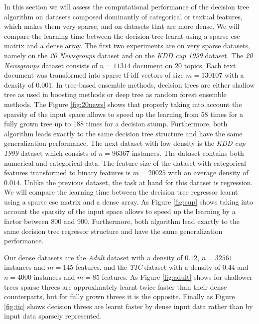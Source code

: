 In this section we will assess the computational performance of the decision tree algorithm on datasets composed dominantly of categorical or textual features, which makes them very sparse, and on datasets that are more dense. We will compare the learning time between the decision tree learnt
using a sparse csc matrix and a dense array.
The first two experiments are on very sparse datasets, namely on the \emph{20 Newsgroups} dataset \cite{joachims1996probabilistic} and on the \emph{KDD cup 1999} dataset\cite{bay2000archive}. The \emph{20 Newsgroups} dataset
consists of $n=11314$ document on $20$ topics. Each text document was
transformed into sparse tf-idf vectors of size $m=130107$ with a density of
$0.001$. 
In tree-based ensemble methods, decision trees are either shallow tree as used
in boosting methods or deep tree as random forest ensemble methods. The Figure
\ref{fig:20news} shows that properly taking into account the sparsity of the
input space allows to speed up the learning from 58 times for a fully grown
tree up to 188 times for a decision stump. Furthermore, both algorithm leads
exactly to the same decision tree structure and have the same generalization
performance. The next dataset with low density is the \emph{KDD cup 1999} dataset which consists of $n=96367$ instances. The dataset contains both numerical and categorical data. The feature size of the dataset with categorical features transformed to binary features is $m=20025$ with an average density of
$0.014$. Unlike the previous dataset, the task at hand for this dataset is regression. We will compare the learning time between the decision tree regressor learnt
using a sparse csc matrix and a dense array. As Figure \ref{fig:cup} shows taking into account the sparsity of the
input space allows to speed up the learning by a factor between 800 and 900. Furthermore, both algorithm lead
exactly to the same decision tree regressor structure and have the same generalization
performance.

Our dense datasets are the \emph{Adult} dataset\cite{Bache+Lichman:2013} with a density of $0.12$, $n=32561$ instances and  $m=145$ features, and the \emph{TIC} dataset\cite{Bache+Lichman:2013} with a density of $0.44$ and $n=4000$ instances and $m=85$ features. As Figure \ref{fig:adult} shows for shallower trees sparse threes are approximately learnt twice faster than their dense counterparts, but for fully grown threes it is the opposite. Finally as Figure \ref{fig:tic} shows decision threes are learnt faster by dense input data rather than by input data sparsely represented. 


